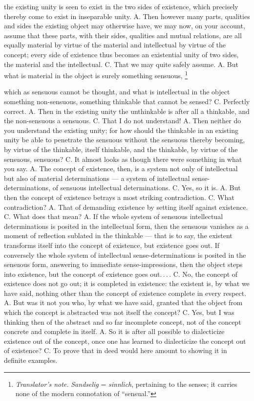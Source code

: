 \documentclass[12pt,a4paper]{book}
\renewcommand{\thefootnote}{\ifcase\value{footnote}\or *)\or **)\or ***)\fi}
\newcommand{\tnote}[1]{%
  \begingroup
  \renewcommand{\thefootnote}{\textdagger}%
  \footnote{\emph{Translator's note.} #1}%
  \addtocounter{footnote}{-1}%
  \endgroup}
\begin{document}
the existing unity is seen to exist in the two sides of existence, which
precisely thereby come to exist in inseparable unity. A. Then however many
parts,
qualities and sides the existing object may otherwise have, we may now, on your
account, assume that these parts, with their sides, qualities and mutual
relations, are all equally material by virtue of the material and intellectual
by virtue of the concept; every side of existence thus becomes an existential
unity of two sides, the material and the intellectual. C. That we may quite
safely assume. A. But what is material in the object is surely something
sensuous,\tnote{\emph{Sandselig} = \textit{sinnlich}, pertaining to the senses;
it carries none of the modern connotation of ``sensual.''} which as sensuous
cannot be thought, and what is intellectual in the object something
non-sensuous, something thinkable that cannot be sensed? C. Perfectly correct.
A. Then in the existing unity the unthinkable is after all a thinkable, and the
non-sensuous a sensuous. C. That I do not understand! A. Then neither do you
understand the existing unity; for how should the thinkable in an existing
unity be able to penetrate the sensuous without the sensuous thereby becoming,
by virtue of the thinkable, itself thinkable, and the thinkable, by virtue of
the sensuous, sensuous? C. It almost looks as though there were something in
what you say. A. The concept of existence, then, is a system not only of
intellectual but also of material determinations --- a system of intellectual
sense-determinations, of sensuous intellectual determinations. C. Yes, so it
is. A. But then the concept of existence betrays a most striking contradiction.
C. What contradiction? A. That of demanding existence by setting itself against
existence. C. What does that mean? A. If the whole system of sensuous
intellectual determinations is posited in the intellectual form, then the
sensuous vanishes as a moment of reflection sublated in the thinkable --- that
is to say, the existent transforms itself into the concept of existence, but
existence goes out. If conversely the whole system of intellectual
sense-determinations is posited in the sensuous form, answering to immediate
sense-impressions, then the object steps into existence, but the concept of
existence goes out.\,.\,.\,. C. No, the concept of existence does not go out;
it is completed
in existence: the existent is, by what we have said, nothing other than the
concept of existence complete in every respect. A. But was it not you who, by
what we have said, granted that the object from which the concept is abstracted
was not itself the concept? C. Yes, but I was thinking then of the abstract and
so far incomplete concept, not of the concept concrete and complete in itself.
A. So it is after all possible to dialecticize existence out of the concept,
once one has learned to dialecticize the concept out of existence? C. To prove
that in deed would here amount to showing it in definite examples.
\end{document}
